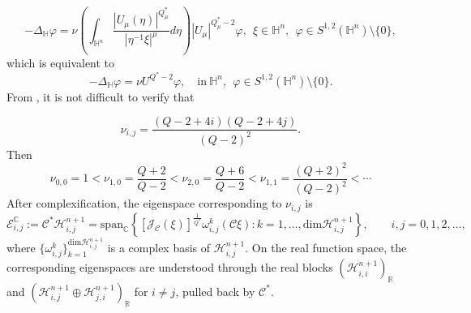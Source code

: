 \documentclass[11pt]{article}
\begin{document}
\begin{equation*}
 -\Delta_{\mathbb{H}} \varphi=\nu\left(\int_{\mathbb{H}^{n}}\frac{|U_\mu(\eta)|
^{Q^{\ast}_{\mu}}}{|\eta^{-1}\xi|^{\mu}}{d}\eta\right)|U_\mu|^{Q^{\ast}_{\mu}-2}\varphi,~~\xi\in\mathbb{H}^{n},~~\varphi\in S^{1,2}(\mathbb{H}^{n})\setminus \{0\},
\end{equation*}
which is equivalent to
\begin{equation*}
 -\Delta_{\mathbb{H}} \varphi=\nu U^{Q^{\ast}-2}\varphi,\quad\mathrm{in}~\mathbb{H}^{n},~~\varphi\in S^{1,2}(\mathbb{H}^{n})\setminus \{0\}.
\end{equation*}
From \cite[Section 5.4]{FL12}, it is not difficult to verify that

\begin{equation*}
  \nu_{i,j}=\frac{(Q-2+4i)(Q-2+4j)}{(Q-2)^2}.
\end{equation*}
Then
\begin{equation}\label{eig1}
 \nu_{0,0}=1<\nu_{1,0}=\frac{Q+2}{Q-2}<\nu_{2,0}=\frac{Q+6}{Q-2}<\nu_{1,1}=\frac{(Q+2)^2}{(Q-2)^2}<\cdots
\end{equation}
{After complexification, the eigenspace corresponding to $\nu_{i,j}$ is
\begin{equation*}
 \mathcal E_{i,j}^{\mathbb C}:=\mathcal C^*\mathcal H_{i,j}^{n+1}
 =\mathrm{span}_{\mathbb C}\left\{[\mathcal{J}_\mathcal{C}(\xi)]^{\frac{1}{Q^{\ast}}}\omega_{i,j}^k(\mathcal{C}\xi):
 k=1,\ldots,\mathrm{dim}\mathcal H_{i,j}^{n+1}\right\},
 \qquad i,j=0,1,2,\ldots,
\end{equation*}
where $\{\omega_{i,j}^k\}_{k=1}^{\mathrm{dim}\mathcal H_{i,j}^{n+1}}$ is a complex basis of $\mathcal H_{i,j}^{n+1}$. On the real function space, the corresponding eigenspaces are understood through the real blocks $(\mathcal H_{i,i}^{n+1})_{\mathbb R}$ and $(\mathcal H_{i,j}^{n+1}\oplus\mathcal H_{j,i}^{n+1})_{\mathbb R}$ for $i\ne j$, pulled back by $\mathcal C^*$.}
\end{document}
